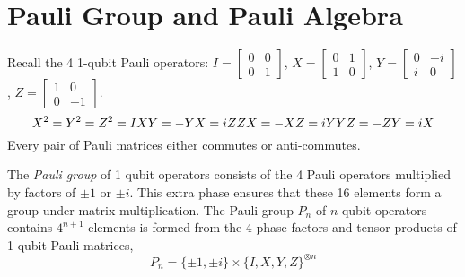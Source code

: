 

\clearpage

\section{Pauli Group and Pauli Algebra}
\label{sec:pauli}
Recall the 4 1-qubit Pauli operators: $I=[\begin{smallmatrix} 0& 0 \\ 0 & 1 \end{smallmatrix}]$,
$X=[\begin{smallmatrix}0 & 1 \\ 1 & 0 \end{smallmatrix}]$, $Y=[\begin{smallmatrix}0 & -i \\ i & 0 \end{smallmatrix}]$, $Z=[\begin{smallmatrix}1 & 0 \\ 0 & -1 \end{smallmatrix}]$.
\[
X^2 = Y^2 = Z^2 = I  \\
XY = -YX = iZ \notag\\
ZX = -XZ = iY \notag\\
YZ = -ZY = iX \notag
\]
Every pair of Pauli matrices either commutes or anti-commutes. 

The {\sl Pauli group} of 1 qubit operators  consists of the 4 Pauli operators  multiplied by factors of $\pm 1$ or $\pm i$. This extra phase ensures that these 16 elements form a group under matrix multiplication. The Pauli group $P_n$ of $n$ qubit operators contains $4^{n+1}$ elements is formed from the 4 phase factors and tensor products of 1-qubit Pauli matrices, 
\[
P_n = \{\pm 1, \pm i\} \times \{I, X, Y, Z\}^{\otimes n}
\]


